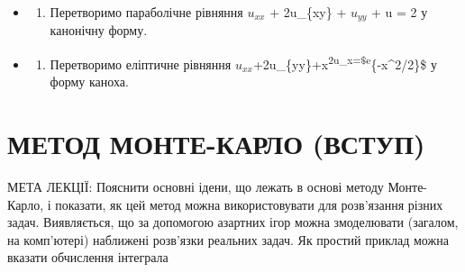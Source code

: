 \documentclass[
]{article}
\providecommand{\tightlist}{%
  \setlength{\itemsep}{0pt}\setlength{\parskip}{0pt}}
\begin{document}
{{{\begin{itemize}
  \begin{itemize}
  \tightlist
  \item
    \begin{enumerate}
    \def\labelenumi{\alph{enumi})}
    \tightlist
    \item
      u\_t = u\_\{xx\} hu ,
    \end{enumerate}
  \item
    \begin{enumerate}
    \def\labelenumi{\arabic{enumi})}
    \setcounter{enumi}{5}
    \tightlist
    \item
      u\_\{xy\} + u\_\{xx\} + 3u = \textbackslash sin x ,
    \end{enumerate}
  \item
    \textbackslash mathbf\{B\}) ~\textbackslash hat\{u\_\{xx\}\} +
    2\textbackslash hat\{u\_\{yy\}\} = 0, - \textbackslash mathbf\{r\})
    ~u\_\{xx\} = \textbackslash sin\^{}2 x ?
  \end{itemize}
\item
  \begin{enumerate}
  \def\labelenumi{\arabic{enumi}.}
  \setcounter{enumi}{1}
  \tightlist
  \item
    Перетворимо параболічне рівняння \(u_{xx}\) + 2u\_\{xy\} +
    \(u_{yy}\) + u = 2 у канонічну форму.
  \end{enumerate}
\item
  \begin{enumerate}
  \def\labelenumi{\arabic{enumi}.}
  \setcounter{enumi}{2}
  \tightlist
  \item
    Перетворимо еліптичне рівняння
    \(u_{xx}\)+2u\_\{yy\}+x\textsuperscript{2u\_x=\$e}\{-x\^{}2/2\}\$ у
    форму каноха.
  \end{enumerate}
\end{itemize}

\section{МЕТОД МОНТЕ-КАРЛО
(ВСТУП)}\label{ux43cux435ux442ux43eux434-ux43cux43eux43dux442ux435-ux43aux430ux440ux43bux43e-ux432ux441ux442ux443ux43f}

МЕТА ЛЕКЦІЇ: Пояснити основні ідени, що лежать в основі методу
Монте-Карло, і показати, як цей метод можна використовувати для
розв'язання різних задач. Виявляється, що за допомогою азартних ігор
можна змоделювати (загалом, на комп'ютері) наближені розв'язки реальних
задач. Як простий приклад можна вказати обчислення інтеграла

}}}
\end{document}
